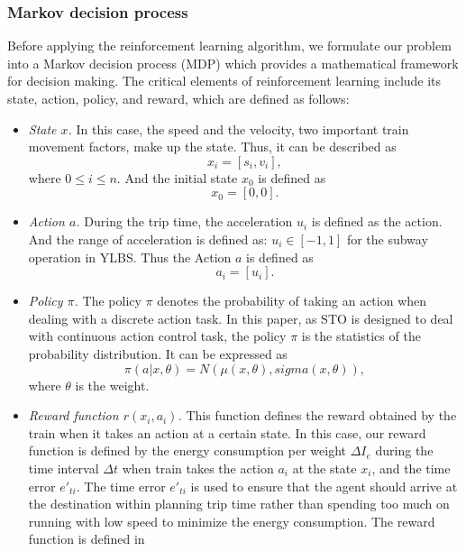 \documentclass[journal]{IEEEtran}
\begin{document}
\subsubsection{Markov decision process}
Before applying the reinforcement learning algorithm, we formulate our problem into a Markov decision process (MDP) which provides a mathematical framework for decision making. The critical elements of reinforcement learning include its state, action, policy, and reward, which are defined as follows:
\begin{itemize}
	\item \emph{State \(x\).} In this case, the speed and the velocity, two important train movement factors, make up the state. Thus, it can be described as
	\begin{equation}
	x_i = [s_i, v_i],	
	\end{equation}
	where \(0 \leq i \leq n\). And the initial state \(x_0\) is defined as
	\begin{equation}
	x_0 = [0, 0].	
	\end{equation}	
	\item \emph{Action \(a\).} During the trip time, the acceleration \( u_i\) is defined as the action. And the range of acceleration is defined as: $u_i \in [-1,1]$ for the subway operation in YLBS. Thus the Action \(a\) is defined as
	\begin{equation}
	a_i = [u_i].	
	\end{equation}	
	\item \emph{Policy \(\pi\).} The policy \(\pi\) denotes the probability of taking an action when dealing with a discrete action task. In this paper, as STO is designed to deal with continuous action control task, the policy \(\pi\) is the statistics of the probability distribution. It can be expressed as
	\begin{equation}
	\pi(a|x,\theta) = N(\mu(x,\theta),sigma(x,\theta)),
	\end{equation}
	where \(\theta\) is the weight.
	\item \emph{Reward function \(r(x_i, a_i)\).} This function defines the reward obtained by the train when it takes an action at a certain state. In this case, our reward function is defined by the energy consumption per weight \(\Delta I_e\) during the time interval \(\Delta t\) when train takes the action \(a_i\) at the state \(x_i\), and the time error \(e'_{ti}\). The time error \(e'_{ti}\) is used to ensure that the agent should arrive at the destination within planning trip time rather than spending too much on running with low speed to minimize the energy consumption. The reward function is defined in

\end{itemize}
\end{document}
